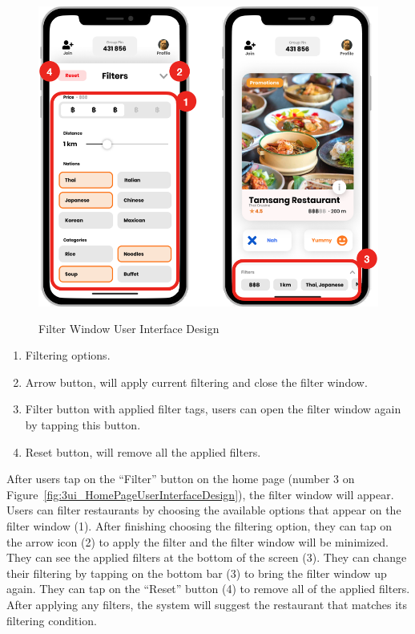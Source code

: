 \documentclass[12pt,oneside,openright,a4paper]{cpe-english-project}
\begin{document}
\newpage
\begin{figure}[H]\centering
\includegraphics[height=300pt]{./images/3ui_FilterWindowUserInterfaceDesign.png}
\caption{Filter Window User Interface Design}\label{fig:3ui_FilterWindowUserInterfaceDesign}
\end{figure}\vspace{-24pt}

\begin{enumerate}
\item Filtering options.
\item Arrow button, will apply current filtering and close the filter window.
\item Filter button with applied filter tags, users can open the filter window again by tapping this button.
\item Reset button, will remove all the applied filters.
\end{enumerate}

After users tap on the “Filter” button on the home page (number 3 on Figure~\ref{fig:3ui_HomePageUserInterfaceDesign}), the filter window will appear. Users can filter restaurants by choosing the available options that appear on the filter window (1). After finishing choosing the filtering option, they can tap on the arrow icon (2) to apply the filter and the filter window will be minimized. They can see the applied filters at the bottom of the screen (3). They can change their filtering by tapping on the bottom bar (3) to bring the filter window up again. They can tap on the “Reset” button (4) to remove all of the applied filters. After applying any filters, the system will suggest the restaurant that matches its filtering condition.
\end{document}
